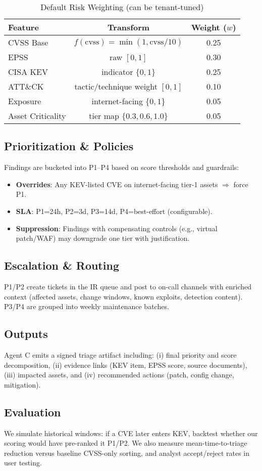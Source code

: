 \begin{table}[!t]
\centering
\caption{Default Risk Weighting (can be tenant-tuned)}
\label{tab:weights}
\begin{tabular}{lcc}
\toprule
Feature & Transform & Weight ($w$)\\
\midrule
CVSS Base & $f(\text{cvss})=\min(1,\text{cvss}/10)$ & 0.25\\
EPSS & raw $[0,1]$ & 0.30\\
CISA KEV & indicator $\{0,1\}$ & 0.25\\
ATT\&CK & tactic/technique weight $[0,1]$ & 0.10\\
Exposure & internet-facing $\{0,1\}$ & 0.05\\
Asset Criticality & tier map $\{0.3,0.6,1.0\}$ & 0.05\\
\bottomrule
\end{tabular}
\end{table}

\subsection{Prioritization \& Policies}
Findings are bucketed into P1--P4 based on score thresholds and guardrails:
\begin{itemize}
  \item \textbf{Overrides}: Any KEV-listed CVE on internet-facing tier-1 assets $\Rightarrow$ force P1.
  \item \textbf{SLA}: P1=24h, P2=3d, P3=14d, P4=best-effort (configurable).
  \item \textbf{Suppression}: Findings with compensating controls (e.g., virtual patch/WAF) may downgrade one tier with justification.
\end{itemize}

\subsection{Escalation \& Routing}
P1/P2 create tickets in the IR queue and post to on-call channels with enriched context (affected assets, change windows, known exploits, detection content). P3/P4 are grouped into weekly maintenance batches.

\subsection{Outputs}
Agent C emits a signed triage artifact including: (i) final priority and score decomposition, (ii) evidence links (KEV item, EPSS score, source documents), (iii) impacted assets, and (iv) recommended actions (patch, config change, mitigation).

\subsection{Evaluation}
We simulate historical windows: if a CVE later enters KEV, backtest whether our scoring would have pre-ranked it P1/P2. We also measure mean-time-to-triage reduction versus baseline CVSS-only sorting, and analyst accept/reject rates in user testing.

